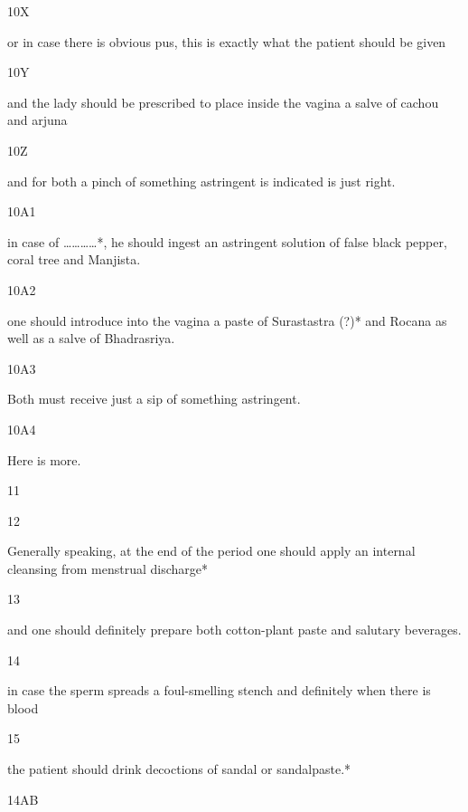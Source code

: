 \begin{translation}
\begin{tt}
\item[10X]

or in case there is obvious pus, this is exactly what the patient should 
  be given
  
\item[10Y]

 and the lady should be prescribed to place  inside the vagina a salve of 
  cachou and arjuna
  
\item[10Z]

and for both a pinch of something astringent is indicated is just right.
  
\item[10A1]

in case of …………*, he should ingest an astringent solution of false 
  black pepper, coral tree and Manjista.
  
\item[10A2]

one should introduce into the vagina a paste of Surastastra (?)* and 
  Rocana as well as  a salve of Bhadrasriya.
  
\item[10A3]

Both must receive just a sip of something astringent.
  
\item[10A4]

Here is more.
  
\item[11]


  
\item[12]

Generally speaking, at the end of the period one should apply an internal 
  cleansing from menstrual discharge*
  
  
\item[13]

and one should definitely prepare both cotton-plant paste and salutary 
  beverages.
  
\item[14]

in case the sperm spreads a foul-smelling stench and definitely when 
  there is blood
  
\item[15]

the patient should drink decoctions of sandal or sandalpaste.*
  
\item[14AB]


\end{tt}
\end{translation}
